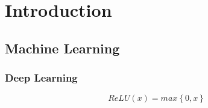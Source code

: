 \pagestyle{fancyArabic}
\section{Introduction}
\vspace{-3em}
\subsection{Machine Learning}
\label{sec:machine learning}
\vspace{-2em}
\hspace{\parindent} \blindtext \cite{nabli_curriculum_2020,daskalakis_independent_2021}

\vspace{-2em}
\newpage
\subsubsection{Deep Learning}
\label{sec:deep learning}
\vspace{-2em}
\hspace{\parindent} \blindtext

\vspace{-2em}
\begin{equation}\label{eq:relu}
    ReLU(x) = max\left\{0,x\right\}
\end{equation}